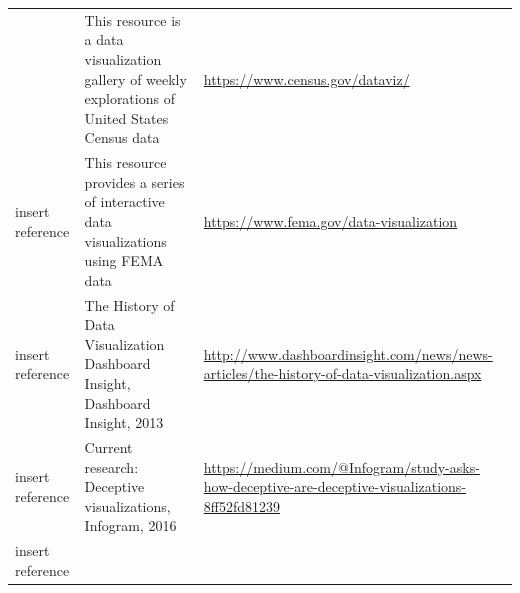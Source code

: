 \documentclass[]{book}
\begin{document}
\begin{longtable}[]{@{}lll@{}}
\begin{minipage}[t]{0.15\columnwidth}
\end{minipage} & \begin{minipage}[t]{0.28\columnwidth}\raggedright
This resource is a data visualization gallery of weekly explorations of United States Census data\strut
\end{minipage} & \begin{minipage}[t]{0.48\columnwidth}\raggedright
\url{https://www.census.gov/dataviz/}\strut
\end{minipage}\tabularnewline
\begin{minipage}[t]{0.15\columnwidth}\raggedright
insert reference\strut
\end{minipage} & \begin{minipage}[t]{0.28\columnwidth}\raggedright
This resource provides a series of interactive data visualizations using FEMA data\strut
\end{minipage} & \begin{minipage}[t]{0.48\columnwidth}\raggedright
\url{https://www.fema.gov/data-visualization}\strut
\end{minipage}\tabularnewline
\begin{minipage}[t]{0.15\columnwidth}\raggedright
insert reference\strut
\end{minipage} & \begin{minipage}[t]{0.28\columnwidth}\raggedright
The History of Data Visualization Dashboard Insight, Dashboard Insight, 2013\strut
\end{minipage} & \begin{minipage}[t]{0.48\columnwidth}\raggedright
\url{http://www.dashboardinsight.com/news/news-articles/the-history-of-data-visualization.aspx}\strut
\end{minipage}\tabularnewline
\begin{minipage}[t]{0.15\columnwidth}\raggedright
insert reference\strut
\end{minipage} & \begin{minipage}[t]{0.28\columnwidth}\raggedright
Current research: Deceptive visualizations, Infogram, 2016\strut
\end{minipage} & \begin{minipage}[t]{0.48\columnwidth}\raggedright
\url{https://medium.com/@Infogram/study-asks-how-deceptive-are-deceptive-visualizations-8ff52fd81239}\strut
\end{minipage}\tabularnewline
\begin{minipage}[t]{0.15\columnwidth}\raggedright
insert reference\strut
\end{minipage} & \begin{minipage}[t]{0.28\columnwidth}\raggedright

\end{minipage}
\end{longtable}
\end{document}
